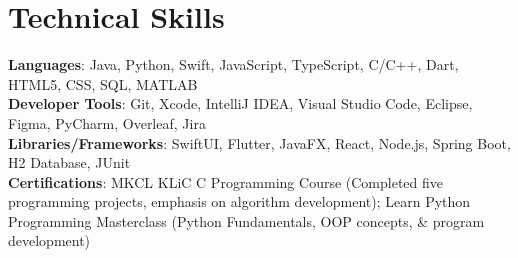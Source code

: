 \documentclass[letterpaper,10pt]{article} %
\begin{document}
\section{\textbf{Technical Skills}}
\begin{itemize}[leftmargin=0.15in, label={}]
  \small{
    \item{
      \textbf{Languages}{: Java, Python, Swift, JavaScript, TypeScript, C/C++, Dart, HTML5, CSS, SQL, MATLAB} \\
      \textbf{Developer Tools}{: Git, Xcode, IntelliJ IDEA, Visual Studio Code, Eclipse, Figma, PyCharm, Overleaf, Jira} \\
      \textbf{Libraries/Frameworks}{: SwiftUI, Flutter, JavaFX, React, Node.js, Spring Boot, H2 Database, JUnit}\\
      \textbf{Certifications}{: MKCL KLiC C Programming Course (Completed five programming projects, emphasis on algorithm development); Learn Python Programming Masterclass (Python Fundamentals, OOP concepts, \& program development)}
    }
  }
\end{itemize}
\end{document}
